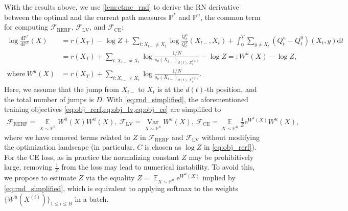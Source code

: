 \documentclass{article}
\theoremstyle{remark}
\newcommand{\e}{\mathrm{e}}
\renewcommand{\P}{\mathbb{P}}
\newcommand{\E}{\operatorname{\mathbb{E}}}
\newcommand{\var}{\operatorname{Var}}
\renewcommand{\d}{\mathrm{d}}
\newcommand{\de}[2]{\frac{\mathrm{d}#1}{\mathrm{d}#2}} %
\newcommand{\cF}{\mathcal{F}}
\newcommand{\ub}{{\bar{u}}}
\begin{document}
With the results above, we use \cref{lem:ctmc_rnd} to derive the RN derivative between the optimal and the current path measures $\P^*$ and $\P^u$, the common term for computing $\cF_{\mathrm{RERF}}$, $\cF_{\mathrm{LV}}$, and $\cF_{\mathrm{CE}}$:
\begin{align}
    \log\de{\P^*}{\P^u}(X)&=r(X_T)-\log Z+\sum_{t:X_{t-}\ne X_t}\log\frac{Q^0_t}{Q^u_t}(X_{t-},X_t) +\int_0^T\sum_{y\ne X_t}(Q^u_t-Q^0_t)(X_t,y)\d t\nonumber\\
    &=r(X_T)+\sum_{t:X_{t-}\ne X_t}\log\frac{1/N}{s_\theta(X_{t-})_{d(t),X_t^{d(t)}}}-\log Z=:W^u(X)-\log Z,\nonumber\\
    \text{where}~W^u(X)&=r(X_T)+\sum_{t:X_{t-}\ne X_t}\log\frac{1/N}{s_\theta(X_{t-})_{d(t),X_t^{d(t)}}}.\label{eq:rnd_simplified}
\end{align}
Here, we assume that the jump from $X_{t-}$ to $X_t$ is at the $d(t)$-th position, and the total number of jumps is $D$. With \cref{eq:rnd_simplified}, the aforementioned training objectives \cref{eq:obj_rerf,eq:obj_lv,eq:obj_ce} are simplified to
\begin{align}
\cF_{\mathrm{RERF}} = \underset{X\sim\P^\ub}{\E}W^\ub(X) W^u (X), ~\cF_{\mathrm{LV}} = \underset{X\sim\P^\ub}{\var} W^u(X), ~\cF_{\mathrm{CE}} = \underset{X\sim\P^\ub}{\E} \frac1Z \e^{W^{\ub}(X)}W^{u}(X),
\label{eq:obj_all}
\end{align}
where we have removed terms related to $Z$ in $\cF_{\mathrm{RERF}}$ and $\cF_{\mathrm{LV}}$ without modifying the optimization landscape (in particular, $C$ is chosen as $\log Z$ in \cref{eq:obj_rerf}). For the CE loss, as in practice the normalizing constant $Z$ may be prohibitively large, removing $\frac1Z$ from the loss may lead to numerical instability. To avoid this, we propose to estimate $Z$ via the equality $Z=\E_{X\sim\P^\ub}\e^{W^\ub(X)}$ implied by \cref{eq:rnd_simplified}, which is equivalent to applying softmax to the weights $\{W^\ub(X^{(i)})\}_{1\le i\le B}$ in a batch.
\end{document}
